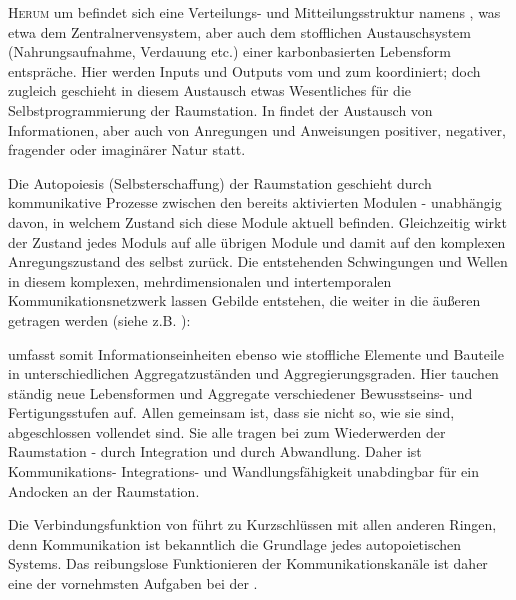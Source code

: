 \begin{newstuff}
    \lettrine{H}{erum} um  befindet sich eine Verteilungs- und Mitteilungsstruktur namens , was etwa dem Zentralnervensystem, aber auch dem stofflichen Austauschsystem (Nahrungsaufnahme, Verdauung etc.) einer karbonbasierten Lebensform entspräche. Hier werden Inputs und Outputs vom und zum  koordiniert; doch zugleich geschieht in diesem Austausch etwas Wesentliches für die Selbstprogrammierung der Raumstation. In  findet der Austausch von Informationen, aber auch von Anregungen und Anweisungen positiver, negativer, fragender oder imaginärer Natur statt. 


    Die Autopoiesis (Selbsterschaffung) der Raumstation geschieht durch kommunikative Prozesse zwischen den bereits aktivierten Modulen - unabhängig davon, in welchem Zustand sich diese Module aktuell befinden. Gleichzeitig wirkt der Zustand jedes Moduls auf alle übrigen Module und damit auf den komplexen Anregungszustand des  selbst zurück. Die entstehenden Schwingungen und Wellen in diesem komplexen, mehrdimensionalen und intertemporalen Kommunikationsnetzwerk lassen Gebilde entstehen, die weiter in die äußeren  getragen werden (siehe z.B. ):

     umfasst somit Informationseinheiten ebenso wie stoffliche Elemente und Bauteile in unterschiedlichen Aggregatzuständen und Aggregierungsgraden. Hier tauchen ständig neue Lebensformen und Aggregate verschiedener Be\-wusst\-seins- und Fertigungsstufen auf. Allen gemeinsam ist, dass sie nicht so, wie sie sind, abgeschlossen vollendet sind. Sie alle tragen bei zum Wiederwerden der Raumstation - durch Integration und durch Abwandlung. Daher ist Kom\-mu\-ni\-ka\-ti\-ons- Integrations- und Wandlungsfähigkeit unabdingbar für ein Andocken an der Raumstation. 

    Die Verbindungsfunktion von  führt zu Kurzschlüssen mit allen anderen Ringen, denn Kommunikation ist bekanntlich die Grundlage jedes autopoietischen Systems. Das reibungslose Funktionieren der Kommunikationskanäle ist daher eine der vornehmsten Aufgaben bei der . 
\end{newstuff}